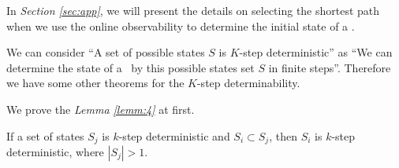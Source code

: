 In {\em Section \ref{sec:app}}, we will present the details on selecting the shortest path when we use the online observability to determine the initial state of a \BCN. 



We can consider ``A set of possible states $S$ is $K$-step deterministic'' as ``We can determine the state of a \BCN\ by this possible states set $S$ in finite steps''. Therefore we have some other theorems for the $K$-step determinability.



We prove the {\em Lemma \ref{lemm:4}} at first.
\begin{lemma}
 If a set of states $S_j$ is $k$-step deterministic and $S_i\subset S_j$, then $S_i$ is $k$-step deterministic, where $|S_j|>1$.
  \label{lemm:4}
\end{lemma}
